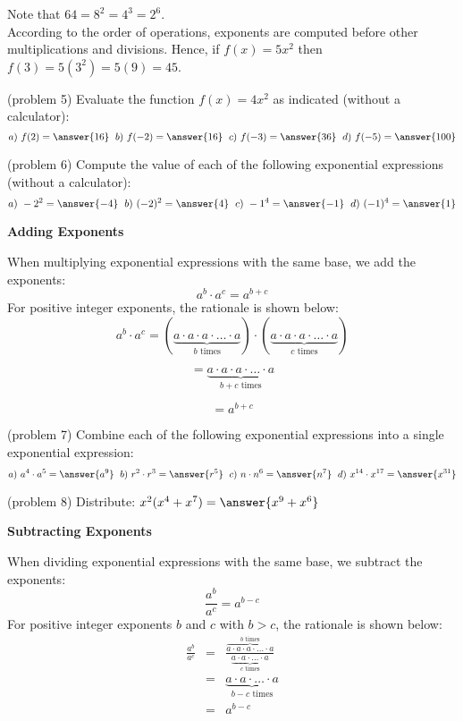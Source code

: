\documentclass[handout]{ximera}
\begin{document}
Note that $64 = 8^2 = 4^3 = 2^6$.\\

According to the order of operations, exponents are computed before other 
multiplications and divisions. Hence, if $f(x) = 5x^2$ then $f(3) = 5(3^2) = 5(9) = 45$.

\begin{problem}(problem 5)
Evaluate the function $f(x) = 4x^2$ as indicated (without a calculator):
\[
a) \ f(2) = \answer{16}  \; \  b) \ f(-2) = \answer{16}  \; \  c) \ f(-3) = \answer{36}  \; \  d) \ f(-5) = \answer{100}
\]
\end{problem}

\begin{problem}(problem 6)
Compute the value of each of the following exponential expressions (without a calculator):
\[
a) \ -2^2 = \answer{-4}  \; \  b) \ (-2)^2 = \answer{4}  \; \  c) \ -1^4 = \answer{-1}  \; \  d) \ (-1)^4 = \answer{1}
\]
\end{problem}

\begin{center}
\textbf{Adding Exponents}
\end{center}
When multiplying exponential expressions with the same base, we add the exponents:
\[
a^b \cdot a^c = a^{b+c}
\] 
For positive integer exponents, the rationale is shown below:
\[
a^b \cdot a^c = (\underbrace{a \cdot a \cdot a \cdot \ldots \cdot a}_\text{$b$ times}) \cdot
(\underbrace{a \cdot a \cdot a \cdot \ldots \cdot a}_\text{$c$ times})
\]

\[
= \underbrace{a \cdot a \cdot a \cdot \ldots \cdot a}_\text{$b+c$ times}
\]

\[
= a^{b+c}
\]

\begin{problem}(problem 7)
Combine each of the following exponential expressions into a single exponential expression:
\[
a) \ a^4\cdot a^5 = \answer{a^9}  \; \  b) \ r^2 \cdot r^3  = \answer{r^5}  \; \  c) \ n\cdot n^6 = \answer{n^7} 
 \; \ d) \ x^{14}\cdot x^{17} = \answer{x^{31}}
\]
\end{problem}


\begin{problem}(problem 8)
Distribute: $x^2(x^4 + x^7)  = \answer{x^9+x^6}$
\end{problem}


\begin{center}
\textbf{Subtracting Exponents}
\end{center}
When dividing exponential expressions with the same base, we subtract the exponents:
\[
\frac{a^b}{a^c} = a^{b-c}
\] 
For positive integer exponents $b$ and $c$ with $b > c$, the rationale is shown below:
\begin{eqnarray*}
\frac{a^b}{a^c} &=& \frac{\overbrace{a \cdot a \cdot a \cdot \ldots \cdot a}^\text{$b$ times}}
{\underbrace{ a \cdot a \cdot \ldots \cdot a}_\text{$c$ times}}\\[10pt]
&=& \underbrace{ a \cdot a \cdot \ldots \cdot a}_\text{$b-c$ times}\\[10pt]
&=& a^{b-c}
\end{eqnarray*}
\end{document}

